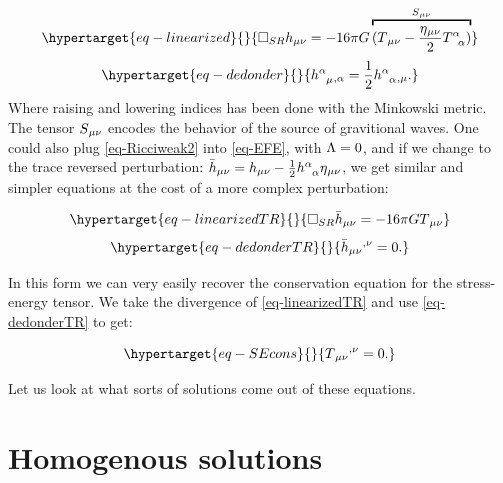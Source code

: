 \documentclass[
  10pt,
  a4paper,
  DIV=11,
  numbers=noendperiod,
  twoside]{scrreprt}
\DeclareRobustCommand{\[}{\begin{equation}}
\DeclareRobustCommand{\]}{\end{equation}}
\begin{document}
\begin{equation}\protect\hypertarget{eq-linearized}{}{
\square_{SR} \weakmet = -16\pi \grav \overbracket{(\SEco-\frac{\mink}{2}\trSE)}^{\srcco} 
}\label{eq-linearized}\end{equation}
\begin{equation}\protect\hypertarget{eq-dedonder}{}{
\ipdv{\mixweakmet[\ind{\alpha}{\mu}]}{\alpha}=\frac{1}{2}\ipdv{\trweakmet}{\mu}. 
}\label{eq-dedonder}\end{equation} Where raising and lowering indices
has been done with the Minkowski metric. The tensor \(S{}_{\mu\nu}\) encodes
the behavior of the source of gravitional waves. One could also plug
\ref{eq-Ricciweak2} into \ref{eq-EFE}, with \(\Lambda=0\), and if we
change to the trace reversed perturbation:
\(\weakTRmet=\weakmet - \frac{1}{2}\trweakmet\mink\), we get similar and
simpler equations at the cost of a more complex perturbation:
 

\begin{equation}\protect\hypertarget{eq-linearizedTR}{}{
\square_{SR} \weakTRmet = -16\pi \grav \SEco
}\label{eq-linearizedTR}\end{equation}
\begin{equation}\protect\hypertarget{eq-dedonderTR}{}{
    \ipdv[^]{\weakTRmet}{\nu}=0. 
}\label{eq-dedonderTR}\end{equation}

In this form we can very easily recover the conservation equation for
the stress-energy tensor. We take the divergence of
\ref{eq-linearizedTR} and use \ref{eq-dedonderTR} to get:

\begin{equation}\protect\hypertarget{eq-SEcons}{}{
    \ipdv[^]{\SEco}{\nu}=0.
}\label{eq-SEcons}\end{equation}

Let us look at what sorts of solutions come out of these equations.

\hypertarget{homogenous-solutions}{%
\section{Homogenous solutions}\label{homogenous-solutions}}
\end{document}
